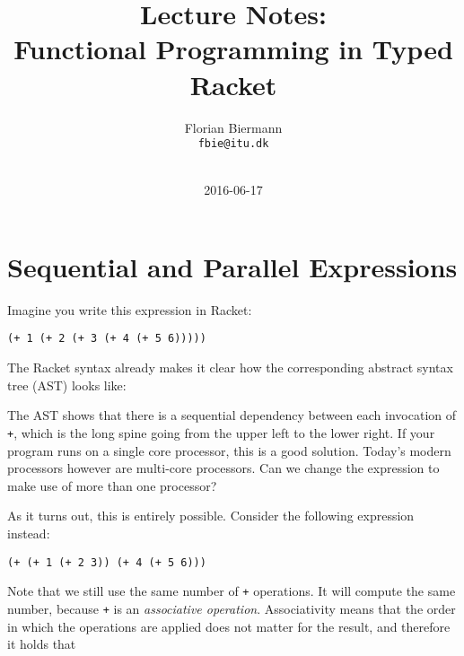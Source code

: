 \documentclass{article}
\title{Lecture Notes:\\Functional Programming in Typed Racket}
\author{Florian Biermann \\\small{\texttt{fbie@itu.dk}} \\~}
\date{2016-06-17}
\begin{document}
\maketitle

\section{Sequential and Parallel Expressions}

Imagine you write this expression in Racket:

\begin{center}
  \lstinline{(+ 1 (+ 2 (+ 3 (+ 4 (+ 5 6)))))}
\end{center}


The Racket syntax already makes it clear how the corresponding abstract syntax tree (AST) looks like:

\begin{center}
\end{center}

The AST shows that there is a sequential dependency between each invocation of \lstinline{+}, which is the long spine going from the upper left to the lower right. If your program runs on a single core processor, this is a good solution. Today's modern processors however are multi-core processors. Can we change the expression to make use of more than one processor?

As it turns out, this is entirely possible. Consider the following expression instead:

\begin{center}
  \lstinline{(+ (+ 1 (+ 2 3)) (+ 4 (+ 5 6)))}
\end{center}

Note that we still use the same number of \lstinline{+} operations. It will compute the same number, because \lstinline{+} is an \emph{associative operation}. Associativity means that the order in which the operations are applied does not matter for the result, and therefore it holds that
\end{document}
